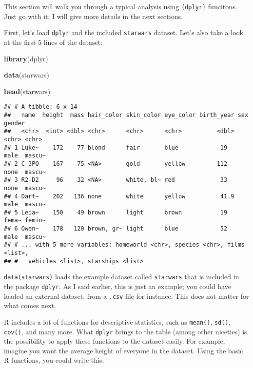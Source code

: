 \documentclass[
]{article}
\newenvironment{Shaded}{\begin{snugshade}}{\end{snugshade}}
\newcommand{\KeywordTok}[1]{\textcolor[rgb]{0.13,0.29,0.53}{\textbf{#1}}}
\newcommand{\NormalTok}[1]{#1}
\newcommand{\OperatorTok}[1]{\textcolor[rgb]{0.81,0.36,0.00}{\textbf{#1}}}
\begin{document}
This section will walk you through a typical analysis using \texttt{\{dplyr\}} funcitons. Just go with it; I
will give more details in the next sections.

First, let's load \texttt{dplyr} and the included \texttt{starwars} dataset. Let's also take a look at the first 5
lines of the dataset:

\begin{Shaded}
\begin{Highlighting}[]
\KeywordTok{library}\NormalTok{(dplyr)}

\KeywordTok{data}\NormalTok{(starwars)}

\KeywordTok{head}\NormalTok{(starwars)}
\end{Highlighting}
\end{Shaded}

\begin{verbatim}
## # A tibble: 6 x 14
##   name  height  mass hair_color skin_color eye_color birth_year sex   gender
##   <chr>  <int> <dbl> <chr>      <chr>      <chr>          <dbl> <chr> <chr> 
## 1 Luke~    172    77 blond      fair       blue            19   male  mascu~
## 2 C-3PO    167    75 <NA>       gold       yellow         112   none  mascu~
## 3 R2-D2     96    32 <NA>       white, bl~ red             33   none  mascu~
## 4 Dart~    202   136 none       white      yellow          41.9 male  mascu~
## 5 Leia~    150    49 brown      light      brown           19   fema~ femin~
## 6 Owen~    178   120 brown, gr~ light      blue            52   male  mascu~
## # ... with 5 more variables: homeworld <chr>, species <chr>, films <list>,
## #   vehicles <list>, starships <list>
\end{verbatim}

\texttt{data(starwars)} loads the example dataset called \texttt{starwars} that is included in the package \texttt{dplyr}.
As I said earlier, this is just an example; you could have loaded an external dataset, from a
\texttt{.csv} file for instance. This does not matter for what comes next.

R includes a lot of functions for descriptive statistics, such as \texttt{mean()}, \texttt{sd()}, \texttt{cov()}, and many
more. What \texttt{dplyr} brings to the table (among other niceties) is the possibility to apply these
functions to the dataset easily. For example, imagine you want the average height of everyone in
the dataset. Using the basic R functions, you could write this:

\begin{Shaded}
\end{Shaded}
\end{document}
